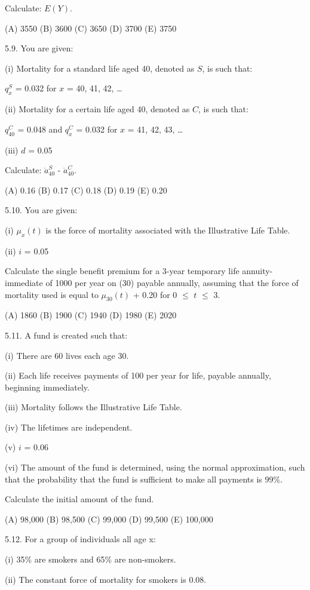 \documentclass[]{book}
\begin{document}
Calculate: \(E(Y)\).

(A) 3550 (B) 3600 (C) 3650 (D) 3700 (E) 3750

5.9. You are given:

(i) Mortality for a standard life aged 40, denoted as \(S\), is such
that:

\(q^S_x\) = 0.032 for \(x\) = 40, 41, 42, \ldots{}

(ii) Mortality for a certain life aged 40, denoted as \(C\), is such
that:

\(q^C_{40}\) = 0.048 and \(q^C_x\) = 0.032 for \(x\) = 41, 42, 43,
\ldots{}

(iii) \(d\) = 0.05

Calculate: \(\ddot{a}^S_{40}\) - \(\ddot{a}^C_{40}\).

(A) 0.16 (B) 0.17 (C) 0.18 (D) 0.19 (E) 0.20

5.10. You are given:

(i) \(\mu_x(t)\) is the force of mortality associated with the
Illustrative Life Table.

(ii) \(i\) = 0.05

Calculate the single benefit premium for a 3-year temporary life
annuity-immediate of 1000 per year on (30) payable annually, assuming
that the force of mortality used is equal to \(\mu_{30}(t)\) + 0.20 for
0 \(\le\) \(t\) \(\le\) 3.

(A) 1860 (B) 1900 (C) 1940 (D) 1980 (E) 2020

5.11. A fund is created such that:

(i) There are 60 lives each age 30.

(ii) Each life receives payments of 100 per year for life, payable
annually, beginning immediately.

(iii) Mortality follows the Illustrative Life Table.

(iv) The lifetimes are independent.

(v) \(i\) = 0.06

(vi) The amount of the fund is determined, using the normal
approximation, such that the probability that the fund is sufficient to
make all payments is 99\%.

Calculate the initial amount of the fund.

(A) 98,000 (B) 98,500 (C) 99,000 (D) 99,500 (E) 100,000

5.12. For a group of individuals all age x:

(i) 35\% are smokers and 65\% are non-smokers.

(ii) The constant force of mortality for smokers is 0.08.
\end{document}
